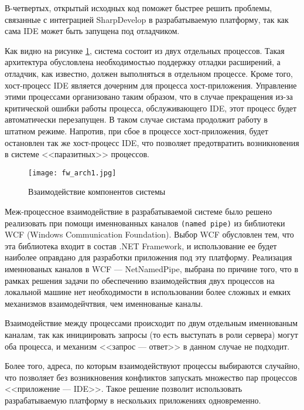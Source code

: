 В-четвертых, открытый исходных код поможет быстрее решить проблемы, связанные с интеграцией SharpDevelop в разрабатываемую платформу, так как сама IDE может быть запущена под отладчиком.

Как видно на рисунке \ref{fw_arch1}, система состоит из двух отдельных процессов. Такая архитектура обусловлена необходимостью поддержку отладки расширений, а отладчик, как известно, должен выполняться в отдельном процессе. Кроме того, хост-процесс IDE является дочерним для процесса хост-приложения. Управление этими процессами организовано таким образом, что в случае прекращения из-за критической ошибки работы процесса, обслуживающего IDE, этот процесс будет автоматически перезапущен. В таком случае систама продолжит работу в штатном режиме. Напротив, при сбое в процессе хост-приложения, будет остановлен так же хост-процесс IDE, что позволяет предотвратить возникновения в системе <<паразитных>> процессов.

\begin{figure}[!h]
    \centering
    \texttt{[image: fw\_arch1.jpg]}
    \caption{Взаимодействие компонентов системы}
    \label{fw_arch1}
\end{figure}

Меж-процессное взаимодействие в разрабатываемой системе было решено реализовать при помощи именнованных каналов {\tt (named pipe)} из библиотеки WCF (Windows Communication Foundation). Выбор WCF обусловлен тем, что эта библиотека входит в состав .NET Framework, и использование ее будет наиболее оправдано для разработки приложения под эту платформу. Реализация именнованых каналов в WCF --- NetNamedPipe, выбрана по причине того, что в рамках решения задачи по обеспечению взаимодействия двух процессов на локальной машине нет необходимости в использовании более сложных и емких механизмов взаимодейчтвия, чем именнованые каналы.

Взаимодействие между процессами происходит по двум отдельным именнованым каналам, так как инициировать запросы (то есть выступать в роли сервера) могут оба процесса, и механизм <<запрос --- ответ>> в данном случае не подходит.

Более того, адреса, по которым взаимодействуют процессы выбираются случайно, что позволяет без возникновения конфликтов запускать множество пар процессов <<приложение --- IDE>>. Такое решение позволит использовать разрабатываемую платформу в нескольких приложениях одновременно.


